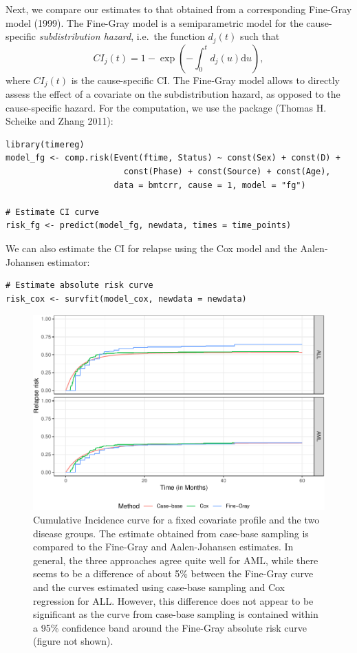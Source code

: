 Next, we compare our estimates to that obtained from a corresponding Fine-Gray model (1999). The Fine-Gray model is a semiparametric model for the cause-specific \emph{subdistribution hazard}, i.e.~the function \(d_j(t)\) such that
\[CI_j(t) = 1 - \exp\left( - \int_0^t d_j(u) \textrm{d}u \right),\]
where \(CI_j(t)\) is the cause-specific CI. The Fine-Gray model allows to directly assess the effect of a covariate on the subdistribution hazard, as opposed to the cause-specific hazard. For the computation, we use the  package (Thomas H. Scheike and Zhang 2011):

\begin{verbatim}
library(timereg)
model_fg <- comp.risk(Event(ftime, Status) ~ const(Sex) + const(D) +
                        const(Phase) + const(Source) + const(Age),
                      data = bmtcrr, cause = 1, model = "fg")

# Estimate CI curve
risk_fg <- predict(model_fg, newdata, times = time_points)
\end{verbatim}

We can also estimate the CI for relapse using the Cox model and the Aalen-Johansen estimator:

\begin{verbatim}
# Estimate absolute risk curve
risk_cox <- survfit(model_cox, newdata = newdata)
\end{verbatim}

\begin{figure}[ht]
\includegraphics[width=\textwidth,keepaspectratio=true]{./compAbsrisk-1} \caption{Cumulative Incidence curve for a fixed covariate profile and the two disease groups. The estimate obtained from case-base sampling is compared to the Fine-Gray and Aalen-Johansen estimates. In general, the three approaches agree quite well for AML, while there seems to be a difference of about 5\% between the Fine-Gray curve and the curves estimated using case-base sampling and Cox regression for ALL. However, this difference does not appear to be significant as the curve from case-base sampling is contained within a 95\% confidence band around the Fine-Gray absolute risk curve (figure not shown).}\label{fig:compAbsrisk}
\end{figure}


